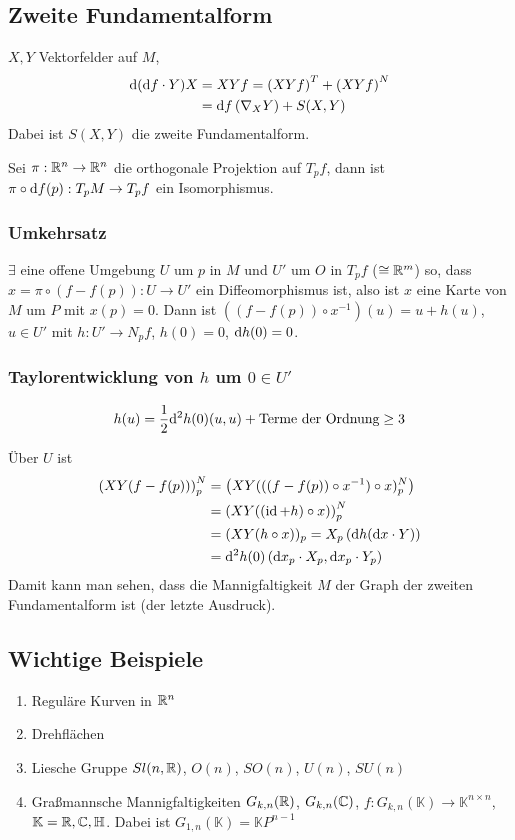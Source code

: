 \documentclass{skript}
\begin{document}
\subsection{Zweite Fundamentalform}
$X,Y$ Vektorfelder auf $M$,
\begin{align*}
  \mathrm d(\mathrm d f\cdot Y)X &= XYf = \left( XYf \right)^T + \left( XYf \right)^N \\
  &= \mathrm d f\left( \nabla_XY \right) + S(X,Y)
\end{align*}
Dabei ist $S(X,Y)$ die zweite Fundamentalform.

Sei $\pi:\mathbb{R}^n \to \mathbb{R}^n$ die orthogonale Projektion auf $T_pf$, dann ist
$\pi\circ\mathrm d f(p): T_pM \to T_pf$ ein Isomorphismus.

\subsubsection{Umkehrsatz}
$\exists$ eine offene Umgebung $U$ um $p$ in $M$ und $U'$ um $O$ in $T_pf$
($\cong\mathbb{R}^m$) so, dass $x=\pi\circ(f - f(p)) : U\to U'$ ein Diffeomorphismus
ist, also ist $x$ eine Karte von $M$ um $P$ mit $x(p) = 0$. Dann ist $\left(
(f - f(p)) \circ x^{-1} \right)(u) = u + h(u)$, $u\in U'$ mit $h:U' \to N_pf$,
$h(0) = 0$, $\mathrm d h(0) = 0$.

\subsubsection{Taylorentwicklung von $h$ um $0\in U'$}
\begin{align*}
  h(u) = \frac{1}{2}\mathrm d^2h(0)(u,u) + \text{Terme der Ordnung} \geq 3
\end{align*}

Über $U$ ist
\begin{align*}
  \left( XY(f-f(p)) \right)^N_p &= \left( XY(((f-f(p))\circ x^{-1})\circ x)^N_p
  \right) \\
  &= \left( XY( (\operatorname{id} + h)\circ x) \right)^N_p \\
  &= (XY(h\circ x))_p = X_p\left( \mathrm d h(\mathrm d x\cdot Y) \right) \\
  &= \mathrm d^2h(0)\left(\mathrm d x_p\cdot X_p, \mathrm d x_p\cdot Y_p  \right)
\end{align*}
Damit kann man sehen, dass die Mannigfaltigkeit $M$ der Graph der zweiten
Fundamentalform ist (der letzte Ausdruck).

\subsection{Wichtige Beispiele}
\begin{enumerate}
  \item Reguläre Kurven in $\mathbb{R}^n$
  \item Drehflächen
  \item Liesche Gruppe $Sl(n,\mathbb{R})$, $O(n)$, $SO(n)$, $U(n)$, $SU(n)$
  \item Graßmannsche Mannigfaltigkeiten $G_{k,n}(\mathbb{R})$, $G_{k,n}(\mathbb{C})$,
    $f:G_{k,n}(\mathbb K) \to \mathbb K^{n\times n}$, $\mathbb K = \mathbb{R},\mathbb{C},\mathbb
    H$.
    Dabei ist $G_{1,n}(\mathbb K) = \mathbb K P^{n-1}$
\end{enumerate}
\end{document}

